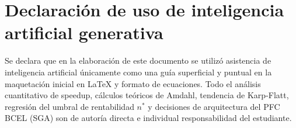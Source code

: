 \documentclass[11pt,a4paper]{article}
\begin{document}
\section{Declaración de uso de inteligencia artificial generativa}

Se declara que en la elaboración de este documento se utilizó asistencia de inteligencia artificial únicamente como una guía superficial y puntual en la maquetación inicial en \LaTeX{} y formato de ecuaciones. Todo el análisis cuantitativo de speedup, cálculos teóricos de Amdahl, tendencia de Karp-Flatt, regresión del umbral de rentabilidad $n^*$ y decisiones de arquitectura del PFC BCEL (SGA) son de autoría directa e individual responsabilidad del estudiante.

\newpage
\printbibliography[title={Referencias Bibliográficas}]
\end{document}
